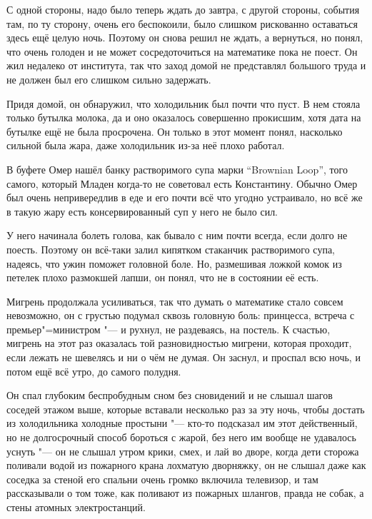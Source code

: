 С одной стороны, надо было теперь ждать до завтра, с другой стороны, события
там, по ту сторону, очень его беспокоили, было слишком рискованно оставаться
здесь ещё целую ночь.
Поэтому он снова решил не ждать, а вернуться, но понял, что очень голоден и не
может сосредоточиться на математике пока не поест.
Он жил недалеко от института, так что заход домой не представлял большого труда
и не должен был его слишком сильно задержать.

Придя домой, он обнаружил, что холодильник был почти что пуст.
В нем стояла только бутылка молока, да и оно оказалось совершенно прокисшим,
хотя дата на бутылке ещё не была просрочена.
Он только в этот момент понял, насколько сильной была жара, даже холодильник
из-за неё плохо работал.

В буфете Омер нашёл банку растворимого супа марки
\enquote{\foreignlanguage{english}{Brownian Loop}},
того самого, который Младен когда-то не советовал есть Константину.
Обычно Омер был очень непривередлив в еде и его почти всё что угодно устраивало,
но всё же в такую жару есть консервированный суп у него не было сил.

У него начинала болеть голова, как бывало с ним почти всегда, если долго не
поесть.
Поэтому он всё-таки залил кипятком стаканчик растворимого супа, надеясь, что
ужин поможет головной боле.
Но, размешивая ложкой комок из петелек плохо размокшей лапши, он понял, что не в
состоянии её есть.

Мигрень продолжала усиливаться, так что думать о математике стало совсем
невозможно, он с грустью подумал сквозь головную боль: принцесса, встреча с
премьер"=министром "--- и рухнул, не раздеваясь, на постель.
К счастью, мигрень на этот раз оказалась той разновидностью мигрени, которая
проходит, если лежать не шевелясь и ни о чём не думая.
Он заснул, и проспал всю ночь, и потом ещё всё утро, до самого полудня.

Он спал глубоким беспробудным сном без сновидений и не слышал шагов соседей
этажом выше, которые вставали несколько раз за эту ночь, чтобы достать из
холодильника холодные простыни "--- кто-то подсказал им этот действенный, но
не долгосрочный способ бороться с жарой, без него им вообще не удавалось уснуть
"--- он не слышал утром крики, смех, и лай во дворе, когда дети сторожа поливали
водой из пожарного крана лохматую дворняжку, он не слышал даже как соседка за
стеной его спальни очень громко включила телевизор, и там рассказывали о том
тоже, как поливают из пожарных шлангов, правда не собак, а стены атомных
электростанций.


